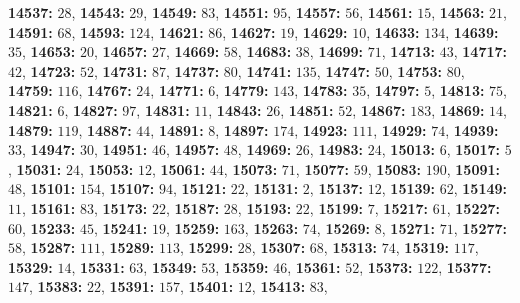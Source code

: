 \textsf{\bfseries 14537:} $28$, \textsf{\bfseries 14543:} $29$, \textsf{\bfseries 14549:} $83$, \textsf{\bfseries 14551:} $95$, \textsf{\bfseries 14557:} $56$, \textsf{\bfseries 14561:} $15$, \textsf{\bfseries 14563:} $21$, \textsf{\bfseries 14591:} $68$, \textsf{\bfseries 14593:} $124$, \textsf{\bfseries 14621:} $86$, \textsf{\bfseries 14627:} $19$, \textsf{\bfseries 14629:} $10$, \textsf{\bfseries 14633:} $134$, \textsf{\bfseries 14639:} $35$, \textsf{\bfseries 14653:} $20$, \textsf{\bfseries 14657:} $27$, \textsf{\bfseries 14669:} $58$, \textsf{\bfseries 14683:} $38$, \textsf{\bfseries 14699:} $71$, \textsf{\bfseries 14713:} $43$, \textsf{\bfseries 14717:} $42$, \textsf{\bfseries 14723:} $52$, \textsf{\bfseries 14731:} $87$, \textsf{\bfseries 14737:} $80$, \textsf{\bfseries 14741:} $135$, \textsf{\bfseries 14747:} $50$, \textsf{\bfseries 14753:} $80$, \textsf{\bfseries 14759:} $116$, \textsf{\bfseries 14767:} $24$, \textsf{\bfseries 14771:} $6$, \textsf{\bfseries 14779:} $143$, \textsf{\bfseries 14783:} $35$, \textsf{\bfseries 14797:} $5$, \textsf{\bfseries 14813:} $75$, \textsf{\bfseries 14821:} $6$, \textsf{\bfseries 14827:} $97$, \textsf{\bfseries 14831:} $11$, \textsf{\bfseries 14843:} $26$, \textsf{\bfseries 14851:} $52$, \textsf{\bfseries 14867:} $183$, \textsf{\bfseries 14869:} $14$, \textsf{\bfseries 14879:} $119$, \textsf{\bfseries 14887:} $44$, \textsf{\bfseries 14891:} $8$, \textsf{\bfseries 14897:} $174$, \textsf{\bfseries 14923:} $111$, \textsf{\bfseries 14929:} $74$, \textsf{\bfseries 14939:} $33$, \textsf{\bfseries 14947:} $30$, \textsf{\bfseries 14951:} $46$, \textsf{\bfseries 14957:} $48$, \textsf{\bfseries 14969:} $26$, \textsf{\bfseries 14983:} $24$, \textsf{\bfseries 15013:} $6$, \textsf{\bfseries 15017:} $5$, \textsf{\bfseries 15031:} $24$, \textsf{\bfseries 15053:} $12$, \textsf{\bfseries 15061:} $44$, \textsf{\bfseries 15073:} $71$, \textsf{\bfseries 15077:} $59$, \textsf{\bfseries 15083:} $190$, \textsf{\bfseries 15091:} $48$, \textsf{\bfseries 15101:} $154$, \textsf{\bfseries 15107:} $94$, \textsf{\bfseries 15121:} $22$, \textsf{\bfseries 15131:} $2$, \textsf{\bfseries 15137:} $12$, \textsf{\bfseries 15139:} $62$, \textsf{\bfseries 15149:} $11$, \textsf{\bfseries 15161:} $83$, \textsf{\bfseries 15173:} $22$, \textsf{\bfseries 15187:} $28$, \textsf{\bfseries 15193:} $22$, \textsf{\bfseries 15199:} $7$, \textsf{\bfseries 15217:} $61$, \textsf{\bfseries 15227:} $60$, \textsf{\bfseries 15233:} $45$, \textsf{\bfseries 15241:} $19$, \textsf{\bfseries 15259:} $163$, \textsf{\bfseries 15263:} $74$, \textsf{\bfseries 15269:} $8$, \textsf{\bfseries 15271:} $71$, \textsf{\bfseries 15277:} $58$, \textsf{\bfseries 15287:} $111$, \textsf{\bfseries 15289:} $113$, \textsf{\bfseries 15299:} $28$, \textsf{\bfseries 15307:} $68$, \textsf{\bfseries 15313:} $74$, \textsf{\bfseries 15319:} $117$, \textsf{\bfseries 15329:} $14$, \textsf{\bfseries 15331:} $63$, \textsf{\bfseries 15349:} $53$, \textsf{\bfseries 15359:} $46$, \textsf{\bfseries 15361:} $52$, \textsf{\bfseries 15373:} $122$, \textsf{\bfseries 15377:} $147$, \textsf{\bfseries 15383:} $22$, \textsf{\bfseries 15391:} $157$, \textsf{\bfseries 15401:} $12$, \textsf{\bfseries 15413:} $83$, 
